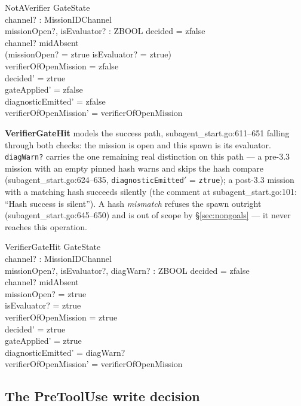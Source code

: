 \documentclass[a4paper,10pt,fleqn]{article}
\newcommand{\field}[1]{\texttt{#1}}
\begin{document}
\begin{schema}{NotAVerifier}
\Delta GateState \\
channel? : MissionIDChannel \\
missionOpen?, isEvaluator? : ZBOOL
\where
decided = zfalse \\
channel? \neq midAbsent \\
\lnot (missionOpen? = ztrue \land isEvaluator? = ztrue) \\
verifierOfOpenMission = zfalse \\
decided' = ztrue \\
gateApplied' = zfalse \\
diagnosticEmitted' = zfalse \\
verifierOfOpenMission' = verifierOfOpenMission
\end{schema}

\textbf{VerifierGateHit} models the success path,
subagent\_start.go:611--651 falling through both checks: the mission
is open and this spawn is its evaluator. \field{diagWarn?} carries
the one remaining real distinction on this path --- a pre-3.3
mission with an empty pinned hash warns and skips the hash compare
(subagent\_start.go:624--635, \field{diagnosticEmitted}$'$ =
\field{ztrue}); a post-3.3 mission with a matching hash succeeds
silently (the comment at subagent\_start.go:101: ``Hash success is
silent''). A hash \emph{mismatch} refuses the spawn outright
(subagent\_start.go:645--650) and is out of scope by
\S\ref{sec:nongoals} --- it never reaches this operation.

\begin{schema}{VerifierGateHit}
\Delta GateState \\
channel? : MissionIDChannel \\
missionOpen?, isEvaluator?, diagWarn? : ZBOOL
\where
decided = zfalse \\
channel? \neq midAbsent \\
missionOpen? = ztrue \\
isEvaluator? = ztrue \\
verifierOfOpenMission = ztrue \\
decided' = ztrue \\
gateApplied' = ztrue \\
diagnosticEmitted' = diagWarn? \\
verifierOfOpenMission' = verifierOfOpenMission
\end{schema}

\subsection{The PreToolUse write decision}
\label{sec:writeops}
\end{document}
